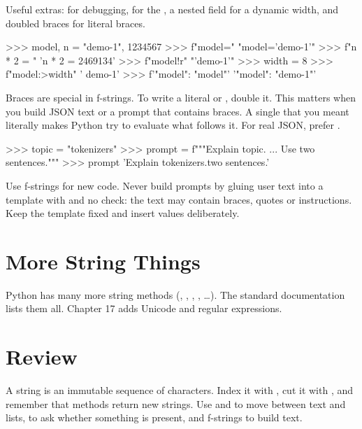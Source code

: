 Useful extras: \code{=} for debugging,  for the , a nested field for a dynamic width, and
doubled braces for literal braces.

\begin{pycode}
>>> model, n = "demo-1", 1234567
>>> f"{model=}"
"model='demo-1'"
>>> f"{n * 2 = }"
'n * 2 = 2469134'
>>> f"{model!r}"
"'demo-1'"
>>> width = 8
>>> f"{model:>{width}}"
'  demo-1'
>>> f'{{"model": "{model}"}}'
'{"model": "demo-1"}'
\end{pycode}

\begin{trap}
Braces are special in f-strings. To write a literal \code{\{} or \code{\}}, double it. This matters when you
build JSON text or a prompt that contains braces. A single \code{\{} that you meant literally makes
Python try to evaluate what follows it. For real JSON, prefer .
\end{trap}

\begin{pycode}
>>> topic = "tokenizers"
>>> prompt = f"""Explain {topic}.
... Use two sentences."""
>>> prompt
'Explain tokenizers.\nUse two sentences.'
\end{pycode}

\begin{gamerule}
Use f-strings for new code. Never build prompts by gluing user text into a template with
\code{+} and no check: the text may contain braces, quotes or instructions. Keep the template
fixed and insert values deliberately.
\end{gamerule}

\section{More String Things}

Python has many more string methods (, , , , \ldots).
The standard documentation lists them all. Chapter 17 adds Unicode and regular expressions.

\section{Review}

A string is an immutable sequence of characters. Index it with \code{[i]}, cut it with
, and remember that methods return new strings. Use  and 
to move between text and lists,  to ask whether something is present, and f-strings to build text.

